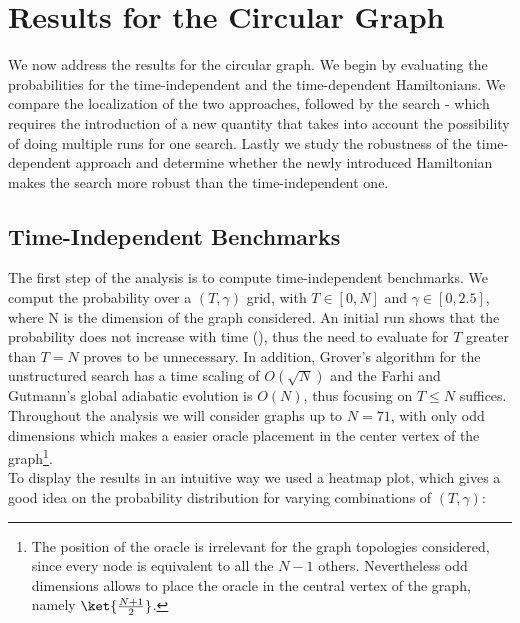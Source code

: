 \clearpage
\section{Results for the Circular Graph}
We now address the results for the circular graph. We begin by evaluating the probabilities for the time-independent and the time-dependent Hamiltonians. We compare the localization of the two approaches, followed by the search - which requires the introduction of a new quantity that takes into account the possibility of doing multiple runs for one search. Lastly we study the robustness of the time-dependent approach and determine whether the newly introduced Hamiltonian makes the search more robust than the time-independent one.
    \subsection{Time-Independent Benchmarks}
        The first step of the analysis is to compute time-independent benchmarks. We comput the probability over a $(T,\gamma)$ grid, with $T\in[0,N]$ and $\gamma\in[0,2.5]$, where N is the dimension of the graph considered. An initial run shows that the probability does not increase with time (), thus the need to evaluate for $T$ greater than $T=N$ proves to be unnecessary. In addition, Grover's algorithm for the unstructured search has a time scaling of $O(\sqrt{N})$ and the Farhi and Gutmann's global adiabatic evolution is $O(N)$, thus focusing on $T \leq N$ suffices.\\
        

        \clearpage
        \noindent
        Throughout the analysis we will consider graphs up to $N = 71$, with only odd dimensions which makes a easier oracle placement in the center vertex of the graph\footnote{The position of the oracle is irrelevant for the graph topologies considered, since every node is equivalent to all the $N-1$ others. Nevertheless odd dimensions allows to place the oracle in the central vertex of the graph, namely $\ket{\frac{N+1}{2}}$.}.  \\

        \noindent
        To display the results in an intuitive way we used a heatmap plot, which gives a good idea on the probability distribution for varying combinations of $(T,\gamma)$:
        

